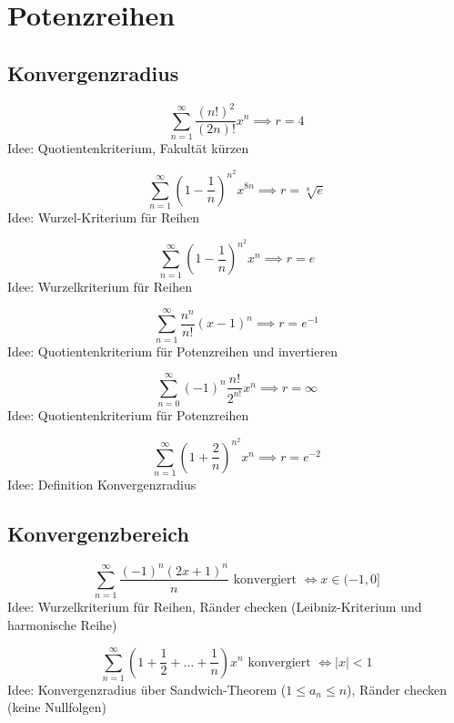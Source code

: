 \section{Potenzreihen}
\subsection{Konvergenzradius}
\begin{displaymath}
  \sum_{n = 1}^{\infty} \frac{(n!)^2}{(2n)!}x^n \implies r = 4
\end{displaymath}
Idee: Quotientenkriterium, Fakultät kürzen

\begin{displaymath}
  \sum_{n = 1}^{\infty} \left(1 - \frac{1}{n}\right)^{n^2} x^{8n} \implies r = \sqrt[8]{e}
\end{displaymath}
Idee: Wurzel-Kriterium für Reihen

\begin{displaymath}
  \sum_{n = 1}^{\infty} \left(1 - \frac{1}{n}\right)^{n^2}x^n \implies r = e
\end{displaymath}
Idee: Wurzelkriterium für Reihen

\begin{displaymath}
  \sum_{n = 1}^{\infty} \frac{n^n}{n!} (x-1)^n \implies r = e^{-1}
\end{displaymath}
Idee: Quotientenkriterium für Potenzreihen und invertieren

\begin{displaymath}
  \sum_{n = 0}^{\infty} (-1)^n \frac{n!}{2^{n!}} x^n \implies r = \infty
\end{displaymath}
Idee: Quotientenkriterium für Potenzreihen

\begin{displaymath}
  \sum_{n = 1}^{\infty} \left(1 + \frac{2}{n}\right)^{n^2} x^n \implies r = e^{-2}
\end{displaymath}
Idee: Definition Konvergenzradius

\subsection{Konvergenzbereich}
\begin{displaymath}
  \sum_{n = 1}^{\infty} \frac{(-1)^n(2x+1)^n}{n} \text{ konvergiert } \iff x \in (-1, 0]
\end{displaymath}
Idee: Wurzelkriterium für Reihen, Ränder checken (Leibniz-Kriterium und harmonische Reihe)

\begin{displaymath}
  \sum_{n = 1}^{\infty} \left(1+\frac{1}{2}+\dots+\frac{1}{n}\right)x^n \text{ konvergiert } \iff |x| < 1
\end{displaymath}
Idee: Konvergenzradius über Sandwich-Theorem ($1 \leq a_n \leq n$), Ränder checken (keine Nullfolgen)


